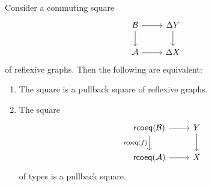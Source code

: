 \begin{thm}\label{thm:rcoeq_cartesian}
Consider a commuting square
\begin{equation*}
\begin{tikzcd}
\mathcal{B} \arrow[r] \arrow[d] & \Delta Y \arrow[d] \\
\mathcal{A} \arrow[r] & \Delta X 
\end{tikzcd}
\end{equation*}
of reflexive graphs. Then the following are equivalent:
\begin{enumerate}
\item The square is a pullback square of reflexive graphs.
\item The square
\begin{equation*}
\begin{tikzcd}
\mathsf{rcoeq}(\mathcal{B}) \arrow[r] \arrow[d,swap,"\mathsf{rcoeq}(f)"] & Y \arrow[d] \\
\mathsf{rcoeq}(\mathcal{A}) \arrow[r] & X 
\end{tikzcd}
\end{equation*}
of types is a pullback square.
\end{enumerate}
\end{thm}

